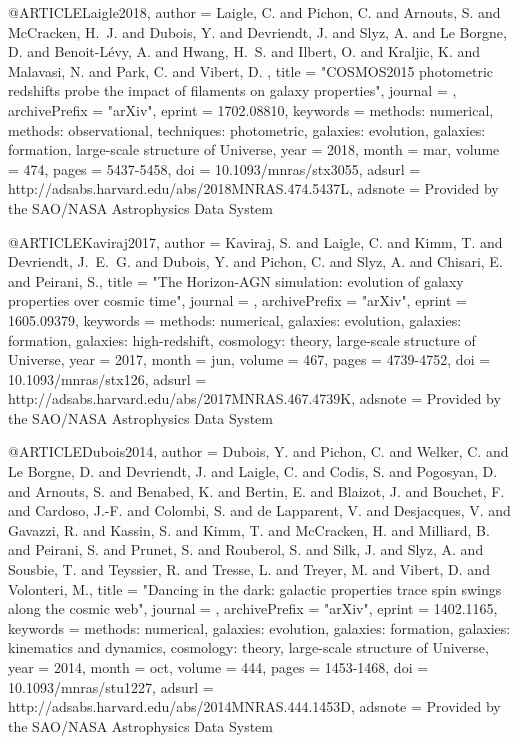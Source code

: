 \documentclass{aa}
\begin{document}
{{{@ARTICLE{Laigle2018,
   author = {{Laigle}, C. and {Pichon}, C. and {Arnouts}, S. and {McCracken}, H.~J. and 
	{Dubois}, Y. and {Devriendt}, J. and {Slyz}, A. and {Le Borgne}, D. and 
	{Benoit-L{\'e}vy}, A. and {Hwang}, H.~S. and {Ilbert}, O. and 
	{Kraljic}, K. and {Malavasi}, N. and {Park}, C. and {Vibert}, D.
	},
    title = "{COSMOS2015 photometric redshifts probe the impact of filaments on galaxy properties}",
  journal = {\mnras},
archivePrefix = "arXiv",
   eprint = {1702.08810},
 keywords = {methods: numerical, methods: observational, techniques: photometric, galaxies: evolution, galaxies: formation, large-scale structure of Universe},
     year = 2018,
    month = mar,
   volume = 474,
    pages = {5437-5458},
      doi = {10.1093/mnras/stx3055},
   adsurl = {http://adsabs.harvard.edu/abs/2018MNRAS.474.5437L},
  adsnote = {Provided by the SAO/NASA Astrophysics Data System}
}

@ARTICLE{Kaviraj2017,
   author = {{Kaviraj}, S. and {Laigle}, C. and {Kimm}, T. and {Devriendt}, J.~E.~G. and 
	{Dubois}, Y. and {Pichon}, C. and {Slyz}, A. and {Chisari}, E. and 
	{Peirani}, S.},
    title = "{The Horizon-AGN simulation: evolution of galaxy properties over cosmic time}",
  journal = {\mnras},
archivePrefix = "arXiv",
   eprint = {1605.09379},
 keywords = {methods: numerical, galaxies: evolution, galaxies: formation, galaxies: high-redshift, cosmology: theory, large-scale structure of Universe},
     year = 2017,
    month = jun,
   volume = 467,
    pages = {4739-4752},
      doi = {10.1093/mnras/stx126},
   adsurl = {http://adsabs.harvard.edu/abs/2017MNRAS.467.4739K},
  adsnote = {Provided by the SAO/NASA Astrophysics Data System}
}

@ARTICLE{Dubois2014,
   author = {{Dubois}, Y. and {Pichon}, C. and {Welker}, C. and {Le Borgne}, D. and 
	{Devriendt}, J. and {Laigle}, C. and {Codis}, S. and {Pogosyan}, D. and 
	{Arnouts}, S. and {Benabed}, K. and {Bertin}, E. and {Blaizot}, J. and 
	{Bouchet}, F. and {Cardoso}, J.-F. and {Colombi}, S. and {de Lapparent}, V. and 
	{Desjacques}, V. and {Gavazzi}, R. and {Kassin}, S. and {Kimm}, T. and 
	{McCracken}, H. and {Milliard}, B. and {Peirani}, S. and {Prunet}, S. and 
	{Rouberol}, S. and {Silk}, J. and {Slyz}, A. and {Sousbie}, T. and 
	{Teyssier}, R. and {Tresse}, L. and {Treyer}, M. and {Vibert}, D. and 
	{Volonteri}, M.},
    title = "{Dancing in the dark: galactic properties trace spin swings along the cosmic web}",
  journal = {\mnras},
archivePrefix = "arXiv",
   eprint = {1402.1165},
 keywords = {methods: numerical, galaxies: evolution, galaxies: formation, galaxies: kinematics and dynamics, cosmology: theory, large-scale structure of Universe},
     year = 2014,
    month = oct,
   volume = 444,
    pages = {1453-1468},
      doi = {10.1093/mnras/stu1227},
   adsurl = {http://adsabs.harvard.edu/abs/2014MNRAS.444.1453D},
  adsnote = {Provided by the SAO/NASA Astrophysics Data System}
}

}}}
\end{document}
